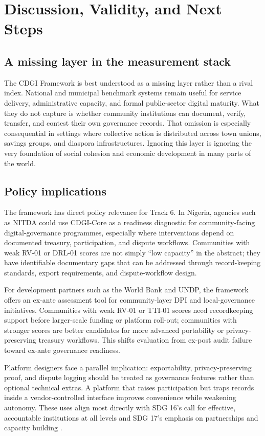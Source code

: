\documentclass[sigconf]{acmart}
\begin{document}
\section{Discussion, Validity, and Next Steps}

\subsection{A missing layer in the measurement stack}

The CDGI Framework is best understood as a missing layer rather than a rival index. National and municipal benchmark systems remain useful for service delivery, administrative capacity, and formal public-sector digital maturity. What they do not capture is whether community institutions can document, verify, transfer, and contest their own governance records. That omission is especially consequential in settings where collective action is distributed across town unions, savings groups, and diaspora infrastructures. Ignoring this layer is ignoring the very foundation of social cohesion and economic development in many parts of the world.

\subsection{Policy implications}

The framework has direct policy relevance for Track 6. In Nigeria, agencies such as NITDA could use CDGI-Core as a readiness diagnostic for community-facing digital-governance programmes, especially where interventions depend on documented treasury, participation, and dispute workflows. Communities with weak RV-01 or DRL-01 scores are not simply ``low capacity'' in the abstract; they have identifiable documentary gaps that can be addressed through record-keeping standards, export requirements, and dispute-workflow design.

For development partners such as the World Bank and UNDP, the framework offers an ex-ante assessment tool for community-layer DPI and local-governance initiatives. Communities with weak RV-01 or TTI-01 scores need recordkeeping support before larger-scale funding or platform roll-out; communities with stronger scores are better candidates for more advanced portability or privacy-preserving treasury workflows. This shifts evaluation from ex-post audit failure toward ex-ante governance readiness.

Platform designers face a parallel implication: exportability, privacy-preserving proof, and dispute logging should be treated as governance features rather than optional technical extras. A platform that raises participation but traps records inside a vendor-controlled interface improves convenience while weakening autonomy. These uses align most directly with SDG 16's call for effective, accountable institutions at all levels and SDG 17's emphasis on partnerships and capacity building \cite{un2015}.
\end{document}
